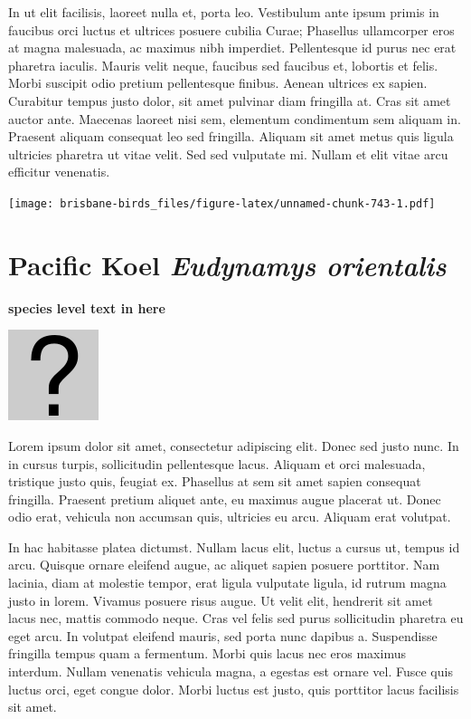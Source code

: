 \documentclass[]{book}
\let\origfigure\figure
\let\endorigfigure\endfigure
\renewenvironment{figure}[1][2] {
  \expandafter\origfigure\expandafter[H]
} {
  \endorigfigure
}
\begin{document}
In ut elit facilisis, laoreet nulla et, porta leo. Vestibulum ante ipsum
primis in faucibus orci luctus et ultrices posuere cubilia Curae;
Phasellus ullamcorper eros at magna malesuada, ac maximus nibh
imperdiet. Pellentesque id purus nec erat pharetra iaculis. Mauris velit
neque, faucibus sed faucibus et, lobortis et felis. Morbi suscipit odio
pretium pellentesque finibus. Aenean ultrices ex sapien. Curabitur
tempus justo dolor, sit amet pulvinar diam fringilla at. Cras sit amet
auctor ante. Maecenas laoreet nisi sem, elementum condimentum sem
aliquam in. Praesent aliquam consequat leo sed fringilla. Aliquam sit
amet metus quis ligula ultricies pharetra ut vitae velit. Sed sed
vulputate mi. Nullam et elit vitae arcu efficitur venenatis.

\begin{figure}
\centering
\texttt{[image: brisbane-birds\_files/figure-latex/unnamed-chunk-743-1.pdf]}
\caption{\label{fig:unnamed-chunk-743}insert figure caption}
\end{figure}

\section{\texorpdfstring{Pacific Koel \emph{Eudynamys
orientalis}}{Pacific Koel Eudynamys orientalis}}\label{pacific-koel-eudynamys-orientalis}

\textbf{species level text in here}

\begin{figure}
\centering
\includegraphics{assets/missing.png}
\caption{No image for species}
\end{figure}

Lorem ipsum dolor sit amet, consectetur adipiscing elit. Donec sed justo
nunc. In in cursus turpis, sollicitudin pellentesque lacus. Aliquam et
orci malesuada, tristique justo quis, feugiat ex. Phasellus at sem sit
amet sapien consequat fringilla. Praesent pretium aliquet ante, eu
maximus augue placerat ut. Donec odio erat, vehicula non accumsan quis,
ultricies eu arcu. Aliquam erat volutpat.

In hac habitasse platea dictumst. Nullam lacus elit, luctus a cursus ut,
tempus id arcu. Quisque ornare eleifend augue, ac aliquet sapien posuere
porttitor. Nam lacinia, diam at molestie tempor, erat ligula vulputate
ligula, id rutrum magna justo in lorem. Vivamus posuere risus augue. Ut
velit elit, hendrerit sit amet lacus nec, mattis commodo neque. Cras vel
felis sed purus sollicitudin pharetra eu eget arcu. In volutpat eleifend
mauris, sed porta nunc dapibus a. Suspendisse fringilla tempus quam a
fermentum. Morbi quis lacus nec eros maximus interdum. Nullam venenatis
vehicula magna, a egestas est ornare vel. Fusce quis luctus orci, eget
congue dolor. Morbi luctus est justo, quis porttitor lacus facilisis sit
amet.
\end{document}
